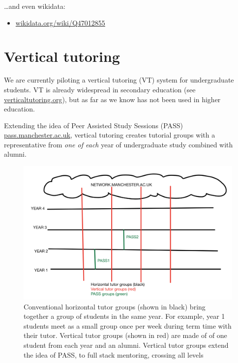 \documentclass[12pt,]{book}
\providecommand{\tightlist}{%
  \setlength{\itemsep}{0pt}\setlength{\parskip}{0pt}}
\begin{document}
\ldots{}and even wikidata:

\begin{itemize}
\tightlist
\item
  \href{https://www.wikidata.org/wiki/Q47012855}{wikidata.org/wiki/Q47012855}
\end{itemize}

\hypertarget{vertical-tutoring-1}{%
\chapter{Vertical tutoring}\label{vertical-tutoring-1}}

We are currently piloting a vertical tutoring (VT) system for undergraduate students. VT is already widespread in secondary education (see \href{https://www.verticaltutoring.org/}{verticaltutoring.org}), but as far as we know has not been used in higher education.

Extending the idea of Peer Assisted Study Sessions (PASS) \href{http://www.pass.manchester.ac.uk}{pass.manchester.ac.uk}, vertical tutoring creates tutorial groups with a representative from \emph{one of each} year of undergraduate study combined with alumni.

\begin{figure}

{\centering \includegraphics[width=1\linewidth]{images/vertical-tutor-groups} 

}

\caption{Conventional horizontal tutor groups (shown in black) bring together a group of students in the same year. For example, year 1 students meet as a small group once per week during term time with their tutor. Vertical tutor groups (shown in red) are made of of one student from each year and an alumni. Vertical tutor groups extend the idea of PASS, to full stack mentoring, crossing all levels}\label{fig:unnamed-chunk-7}
\end{figure}
\end{document}
